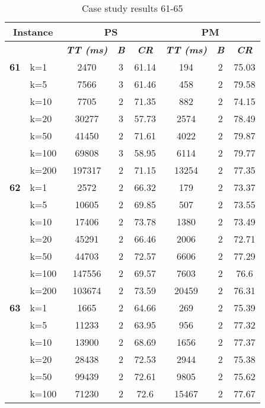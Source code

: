     \begin{table}[htbp]
    \caption{Case study results 61-65}
    \centering
    \begin{tabular}{|l|l|c|c|c|c|c|c|}
    \hline
    \multicolumn{ 2}{|c|}{\textbf{Instance}} & \multicolumn{ 3}{c|}{\textbf{PS}} & \multicolumn{ 3}{c|}{\textbf{PM}} \\ \hline
    \multicolumn{ 2}{|l|}{} & \textbf{\textit{TT (ms)}} & \textbf{\textit{B}} & \textbf{\textit{CR}} & \textbf{\textit{TT (ms)}} & \textbf{\textit{B}} & \textbf{\textit{CR}} \\ \hline
    \multicolumn{1}{|r|}{\textbf{61}} & k=1 & 2470 & 3 & 61.14 & 194 & 2 & 75.03 \\ 
     & k=5 & 7566 & 3 & 61.46 & 458 & 2 & 79.58 \\ 
     & k=10 & 7705 & 2 & 71.35 & 882 & 2 & 74.15 \\ 
     & k=20 & 30277 & 3 & 57.73 & 2574 & 2 & 78.49 \\ 
     & k=50 & 41450 & 2 & 71.61 & 4022 & 2 & 79.87 \\ 
     & k=100 & 69808 & 3 & 58.95 & 6114 & 2 & 79.77 \\ 
     & k=200 & 197317 & 2 & 71.15 & 13254 & 2 & 77.35 \\ \hline
    \multicolumn{1}{|r|}{\textbf{62}} & k=1 & 2572 & 2 & 66.32 & 179 & 2 & 73.37 \\ 
     & k=5 & 10605 & 2 & 69.85 & 507 & 2 & 73.55 \\ 
     & k=10 & 17406 & 2 & 73.78 & 1380 & 2 & 73.49 \\ 
     & k=20 & 45291 & 2 & 66.46 & 2006 & 2 & 72.71 \\ 
     & k=50 & 44703 & 2 & 72.57 & 6606 & 2 & 77.29 \\ 
     & k=100 & 147556 & 2 & 69.57 & 7603 & 2 & 76.6 \\ 
     & k=200 & 103674 & 2 & 73.59 & 20459 & 2 & 76.31 \\ \hline
    \multicolumn{1}{|r|}{\textbf{63}} & k=1 & 1665 & 2 & 64.66 & 269 & 2 & 75.39 \\ 
     & k=5 & 11233 & 2 & 63.95 & 956 & 2 & 77.32 \\ 
     & k=10 & 13900 & 2 & 68.69 & 1656 & 2 & 77.37 \\ 
     & k=20 & 28438 & 2 & 72.53 & 2944 & 2 & 75.38 \\ 
     & k=50 & 99439 & 2 & 72.61 & 9805 & 2 & 75.62 \\ 
     & k=100 & 71230 & 2 & 72.6 & 15467 & 2 & 77.67 \\ 

\end{tabular}
\end{table}
